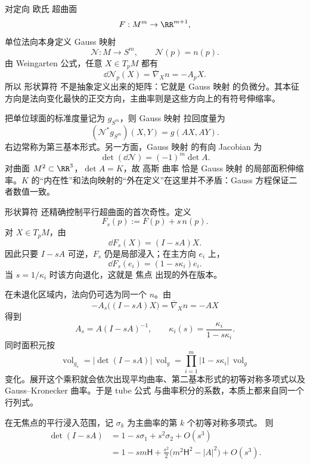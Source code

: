 对定向 欧氏 超曲面
\[
F:M^m\to\RR^{m+1},
\]
单位法向本身定义 Gauss 映射
\begin{equation*}\mathcal N:M\longrightarrow S^m,
\qquad
\mathcal N(p)=n(p).\end{equation*}
由 Weingarten 公式，任意 $X\in T_pM$ 都有
\begin{equation}
{
\dd\mathcal N_p(X)
=\overline\nabla_Xn
=-A_pX.
}
\label{eq:math-dg-gauss-map-differential}
\end{equation}
所以 形状算符 不是抽象定义出来的矩阵：它就是 Gauss 映射 的负微分。其本征方向是法向变化最快的正交方向，主曲率则是这些方向上的有符号伸缩率。

把单位球面的标准度量记为 $g_{S^m}$，则 Gauss 映射 拉回度量为
\begin{equation*}(\mathcal N^*g_{S^m})(X,Y)
=g(AX,AY).\end{equation*}
右边常称为第三基本形式。另一方面，Gauss 映射 的有向 Jacobian 为
\begin{equation*}\det(\dd\mathcal N)
=(-1)^m\det A.\end{equation*}
对曲面 $M^2\subset\RR^3$，$\det A=K$，故 高斯 曲率 恰是 Gauss 映射 的局部面积伸缩率。$K$ 的“内在性”和法向映射的“外在定义”在这里并不矛盾：Gauss 方程保证二者数值一致。

形状算符 还精确控制平行超曲面的首次奇性。定义
\[
F_s(p):=F(p)+s\,n(p).
\]
对 $X\in T_pM$，由
\begin{equation*}\dd F_s(X)
=(I-sA)X.\end{equation*}
因此只要 $I-sA$ 可逆，$F_s$ 仍是局部浸入；在主方向 $e_i$ 上，
\[
\dd F_s(e_i)=(1-s\kappa_i)e_i.
\]
当 $s=1/\kappa_i$ 时该方向退化，这就是 焦点 出现的外在版本。

在未退化区域内，法向仍可选为同一个 $n$。由
\[
-A_s\bigl((I-sA)X\bigr)
=\overline\nabla_Xn
=-AX
\]
得到
\begin{equation*}{
A_s=A(I-sA)^{-1},
\qquad
\kappa_i(s)=\frac{\kappa_i}{1-s\kappa_i}.
}\end{equation*}
同时面积元按
\begin{equation}
\operatorname{vol}_{g_s}
=|\det(I-sA)|\,\operatorname{vol}_g
=\prod_{i=1}^m|1-s\kappa_i|\,\operatorname{vol}_g
\label{eq:math-dg-parallel-area-jacobian}
\end{equation}
变化。展开这个乘积就会依次出现平均曲率、第二基本形式的初等对称多项式以及 Gauss--Kronecker 曲率。于是 tube 公式 与曲率积分的系数，本质上都来自同一个 行列式。

\begin{proposition}[平行浸入的二阶面积响应]
在无焦点的平行浸入范围，记 $\sigma_k$ 为主曲率的第 $k$ 个初等对称多项式。
则
\[
\begin{aligned}
\det(I-sA)
&=1-s\sigma_1+s^2\sigma_2+O(s^3)\\
&=1-sm\mathsf H+\frac{s^2}{2}
\bigl(m^2\mathsf H^2-|A|^2\bigr)+O(s^3).
\end{aligned}
\]
\end{proposition}

